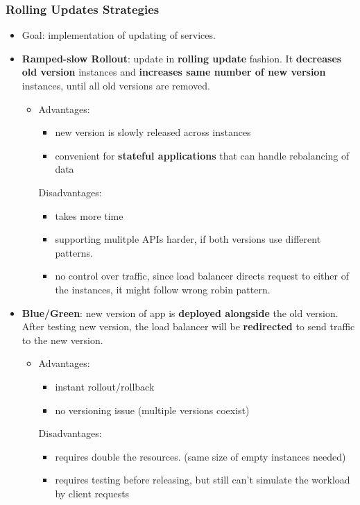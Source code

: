\subsubsection{Rolling Updates Strategies}
\begin{itemize}
	\item Goal: implementation of updating of services.
	\item \textbf{Ramped-slow Rollout}: update in \textbf{rolling update} fashion. It \textbf{decreases old version} instances and \textbf{increases same number of new version} instances, until all old versions are removed.
	\begin{itemize}
		\item Advantages: 
		\begin{itemize}
			\item new version is slowly released across instances
			\item convenient for \textbf{stateful applications} that can handle rebalancing of data
		\end{itemize}
		Disadvantages:
		\begin{itemize}
			\item takes more time
			\item supporting mulitple APIs harder, if both versions use different patterns.
			\item no control over traffic, since load balancer directs request to either of the instances, it might follow wrong robin pattern.
		\end{itemize}
	\end{itemize}
	
	
	\item \textbf{Blue/Green}: new version of app is \textbf{deployed alongside} the old version. After testing new version, the load balancer will be \textbf{redirected} to send traffic to the new version. 
	
	\begin{itemize}
		\item Advantages:
		\begin{itemize}
			\item instant rollout/rollback
			\item no versioning issue (multiple versions coexist)
		\end{itemize}
		Disadvantages:
		\begin{itemize}
			\item requires double the resources. (same size of empty instances needed)
			\item requires testing before releasing, but still can't simulate the workload by client requests
		\end{itemize}
	\end{itemize}
	

\end{itemize}
